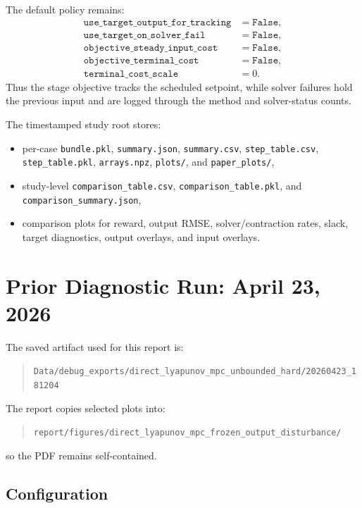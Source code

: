 \documentclass[11pt]{article}
\begin{document}
The default policy remains:
\begin{align}
\texttt{use\_target\_output\_for\_tracking} &= \texttt{False},\\
\texttt{use\_target\_on\_solver\_fail} &= \texttt{False},\\
\texttt{objective\_steady\_input\_cost} &= \texttt{False},\\
\texttt{objective\_terminal\_cost} &= \texttt{False},\\
\texttt{terminal\_cost\_scale} &= 0.
\end{align}
Thus the stage objective tracks the scheduled setpoint, while solver failures
hold the previous input and are logged through the method and solver-status
counts.

The timestamped study root stores:
\begin{itemize}[leftmargin=1.5em]
\item per-case \texttt{bundle.pkl}, \texttt{summary.json}, \texttt{summary.csv},
\texttt{step\_table.csv}, \texttt{step\_table.pkl}, \texttt{arrays.npz},
\texttt{plots/}, and \texttt{paper\_plots/},
\item study-level \texttt{comparison\_table.csv},
\texttt{comparison\_table.pkl}, and \texttt{comparison\_summary.json},
\item comparison plots for reward, output RMSE, solver/contraction rates, slack,
target diagnostics, output overlays, and input overlays.
\end{itemize}

\section{Prior Diagnostic Run: April 23, 2026}

The saved artifact used for this report is:
\begin{quote}
\texttt{Data/debug\_exports/direct\_lyapunov\_mpc\_unbounded\_hard/20260423\_181204}
\end{quote}
The report copies selected plots into:
\begin{quote}
\texttt{report/figures/direct\_lyapunov\_mpc\_frozen\_output\_disturbance/}
\end{quote}
so the PDF remains self-contained.

\subsection{Configuration}
\end{document}

